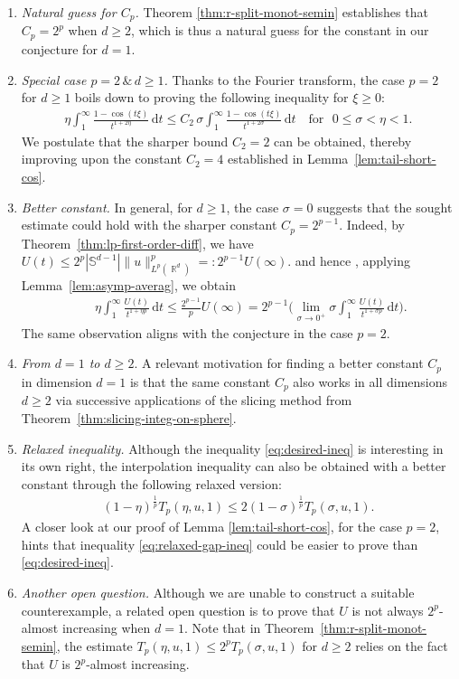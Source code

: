 \documentclass[12pt, reqno]{amsart}%
\theoremstyle{plain}  %
\theoremstyle{definition}  %
\theoremstyle{remark}
\numberwithin{equation}{section}
\DeclareMathOperator{\R}{\mathbb{R}}
\renewcommand{\d}{\,\mathrm{d}}
\begin{document}
\begin{enumerate}
\item \textit{Natural guess for $C_p$.}
Theorem \ref{thm:r-split-monot-semin} establishes that $C_p = 2^p$ when $d \geq 2$, which is thus a natural guess for the constant in our conjecture for $d = 1$.
\item  \textit{Special case $p=2\, \&\, d\geq 1$.}
Thanks to the Fourier transform, the case $p=2$ for $d\geq 1$ boils down to proving the following inequality for $\xi\geq 0$:
\begin{align*}
\eta \int_1^\infty \frac{1-\cos(t\xi)}{t^{1+2\eta }}\d t\leq C_2\, \sigma \int_1^\infty \frac{1-\cos(t\xi)}{t^{1+2\sigma }}\d t\quad\text{for }\,\, 0\leq \sigma<\eta<1.
\end{align*}
We postulate that the sharper bound $C_2 = 2$ can be obtained, thereby improving upon the constant $C_2 = 4$ established in Lemma~\ref{lem:tail-short-cos}.
\item \textit{Better constant.} In general, for $d \ge 1$, the case $\sigma = 0$ suggests that the sought estimate could hold with the sharper constant $C_p = 2^{p-1}$. Indeed, by Theorem~\ref{thm:lp-first-order-diff}, we have $U(t) \leq 2^p |\mathbb{S}^{d-1}| \|u\|^p_{L^p(\R^d)} =: 2^{p-1} U(\infty).$ and hence , applying Lemma~\ref{lem:asymp-averag}, we obtain
\begin{align*}
\qquad \eta \int_1^\infty \frac{U(t)}{t^{1+\eta p}}\d t
\leq
\frac{2^{p-1} }{p} U(\infty) =2^{p-1} \Big(\lim_{\sigma\to 0^+} \sigma \int_1^\infty  \frac{U(t)}{t^{1+\sigma p}} \d t\Big).
\end{align*}
The same observation aligns with the conjecture in the case  $p=2$.

\item \textit{From $d=1$ to $d\geq 2$}.
A relevant motivation for finding a better constant $C_p$ in dimension $d=1$ is that the same constant $C_p$ also works in all dimensions $d\geq 2$ via successive applications of the slicing method from Theorem~\ref{thm:slicing-integ-on-sphere}.

\item \textit{Relaxed inequality.}
Although the inequality \eqref{eq:desired-ineq} is interesting in its own right, the interpolation inequality can also be obtained with a better constant through the following relaxed version:
\begin{align}\label{eq:relaxed-gap-ineq}
(1-\eta)^{\frac{1}{p}}T_p(\eta, u,1)\leq 2 (1-\sigma)^{\frac{1}{p}}T_p(\sigma,u, 1).
\end{align}
A closer look at our proof of Lemma \ref{lem:tail-short-cos}, for  the case $p=2$, hints that inequality \eqref{eq:relaxed-gap-ineq} could be easier to prove than \eqref{eq:desired-ineq}.

\item \textit{Another open question.}
 Although we are unable to construct a suitable counterexample, a related open question is to prove that $U$ is not always $2^p$-almost increasing when $d = 1$. Note that in Theorem~\ref{thm:r-split-monot-semin}, the estimate $T_p(\eta, u,1)\leq 2^p T_p(\sigma,u,1)$ for $d \ge 2$ relies on the fact that $U$ is $2^p$-almost increasing.
\end{enumerate}
\end{document}
